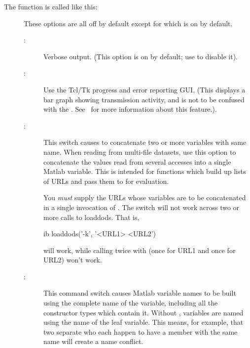 The function is called like this:


\begin{description}

\item[]  These options are all off by default except for
 which is on by default. 


\begin{description}

\item[:] Verbose output. (This option is on by default; use
   to disable it).

\item[:] Use the Tcl/Tk progress and error reporting GUI.
  (This displays a bar graph showing transmission activity, and is not
  to be confused with the \GUI .  See \OPDuser\ for more information
  about this feature.). 

\item[:] This switch causes  to concatenate two
  or more variables with same name.  When reading from multi-file
  datasets, use this option to concatenate the values read from
  several accesses into a single Matlab variable. This is intended for
   functions which build up lists of URLs and pass them to
   for evaluation. 

  You \emph{must} supply the URLs whose variables are to be
  concatenated in a single invocation of . The 
  switch will not work across two or more calls to loaddods. That is,

\begin{vcode}{ib}
loaddods('-k', '<URL1> <URL2') 
\end{vcode}

will work, while calling  twice with  (once for
URL1 and once for URL2) won't work. 

\item[:] This command switch causes Matlab variable names to
  be built using the complete name of the variable, including all the
  constructor types which contain it. Without , variables are
  named using the name of the leaf variable.  This means, for example,
  that two separate  who each happen to have a
  member with the same name will create a name conflict.


\end{description}
\end{description}
